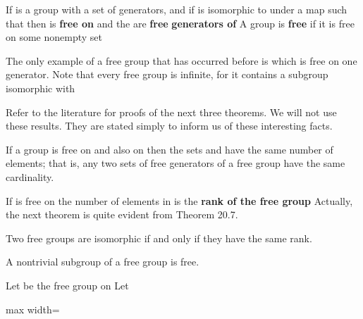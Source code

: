 \documentclass[11pt,oneside]{article}
\begin{document}
\BookNarrativetrue

\begin{BookBody}

 If  is a group with a set  of generators, and if  is isomorphic to  under a map  such that  then  is\textbf{ free on}  and the  are\textbf{ free} \textbf{generators of}  A group is\textbf{ free} if it is free on some nonempty set \BookEnd{\blacksquare}

 The only example of a free group that has occurred before is  which is free on one generator. Note that every free group is infinite, for it contains a subgroup isomorphic with \BookEnd{\blacktriangle}

Refer to the literature for proofs of the next three theorems. We will not use these results. They are stated simply to inform us of these interesting facts.

 If a group  is free on  and also on  then the sets  and  have the same number of elements; that is, any two sets of free generators of a free group have the same cardinality.

 If  is free on  the number of elements in  is the\textbf{ rank of the free group}  Actually, the next theorem is quite evident from Theorem 20.7.

 Two free groups are isomorphic if and only if they have the same rank.

 A nontrivial subgroup of a free group is free.

 Let  be the free group on  Let

\begin{center}\begin{adjustbox}{max width=\linewidth}\end{adjustbox}\end{center}


\end{BookBody}
\end{document}
